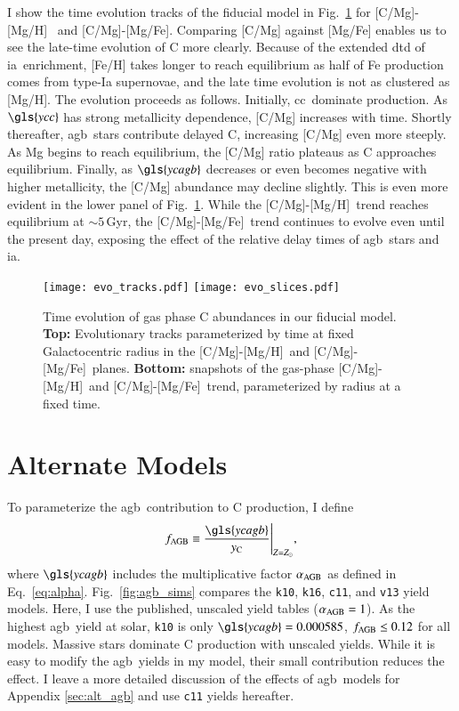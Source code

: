 \documentclass[12pt,oneside,letterpaper]{report}
\newcommand{\cc}{\gls{cc}}
\newcommand{\agb}{\gls{agb}}
\newcommand{\ia}{\gls{ia}}
\newcommand{\cxi}{\texttt{\gls{c11}}}
\newcommand{\kx}{\texttt{\gls{k10}}}
\newcommand{\kxvi}{\texttt{\gls{k16}}}
\newcommand{\vxiii}{\texttt{\gls{v13}}}
\newcommand{\Ycc}{\gls{ycc}}
\newcommand{\Ycagb}{\gls{ycagb}}
\newcommand{\Yct}{\ensuremath{y_{\rm C}}}
\newcommand{\caah}{[C/Mg]-[Mg/H]}
\newcommand{\caafe}{[C/Mg]-[Mg/Fe]}
\newcommand{\about}[1]{${\sim} #1$}
\begin{document}
I show the time evolution tracks of the fiducial model in Fig.~\ref{fig:c_evo} for \caah~ and \caafe. Comparing [C/Mg] against [Mg/Fe] enables us to see the late-time evolution of C more clearly. Because of the extended \gls{dtd} of \ia\ enrichment, [Fe/H] takes longer to reach equilibrium as half of Fe production comes from type-Ia supernovae, and the late time evolution is not as clustered as [Mg/H].
The evolution proceeds as follows.
Initially, \cc\ dominate production. As $\Ycc$ has strong metallicity dependence, [C/Mg] increases with time. Shortly thereafter, \agb\ stars contribute delayed C, increasing [C/Mg] even more steeply. As Mg begins to reach equilibrium, the [C/Mg] ratio plateaus as C approaches equilibrium. Finally, as $\Ycagb$ decreases or even becomes negative with higher metallicity, the [C/Mg] abundance may decline slightly. 
This is even more evident in the lower panel of Fig.~\ref{fig:c_evo}. While the \caah\ trend reaches equilibrium at \about{5}\,Gyr, the \caafe\ trend continues to evolve even until the present day, exposing the effect of the relative delay times of \agb\ stars and \ia.


\begin{figure}[htp]
\centering
\texttt{[image: evo\_tracks.pdf]}
\texttt{[image: evo\_slices.pdf]}
\caption[C chemical evolution tracks]{
    Time evolution of gas phase C abundances in our fiducial model.
    {\bf Top:} Evolutionary tracks parameterized by time at fixed Galactocentric radius in the \caah\ and \caafe\ planes. 
    {\bf Bottom:} snapshots of the gas-phase \caah\ and \caafe\ trend, parameterized by radius at a fixed time.
}
\label{fig:c_evo}
\end{figure}

\section{Alternate Models}\label{sec:f-z-models}

To parameterize the \agb\ contribution to C production, I define 
\begin{equation}\label{eq:f_agb}
    f_{\rm AGB} \equiv \frac{\Ycagb}{\Yct}\Bigg\vert_{Z=Z_\odot},
\end{equation}
where  $\Ycagb$ includes the multiplicative factor $\alpha_{\rm AGB}$ as defined in Eq.~\ref{eq:alpha}.
Fig.~\ref{fig:agb_sims} compares the \kx{}, \kxvi{}, \cxi{}, and \vxiii{} yield models. Here, I use the published, unscaled yield tables ($\alpha_{\rm AGB}=1$). As the highest \agb\ yield at solar, \kx{} is only $\Ycagb=0.000585$, $f_{\rm AGB} \leq 0.12$ for all models. Massive stars dominate C production with unscaled yields.  While it is easy to modify the \agb\ yields in my model, their small contribution reduces the effect. I leave a more detailed discussion of the effects of \agb\ models for Appendix \ref{sec:alt_agb} and use \cxi{} yields hereafter.
\end{document}
